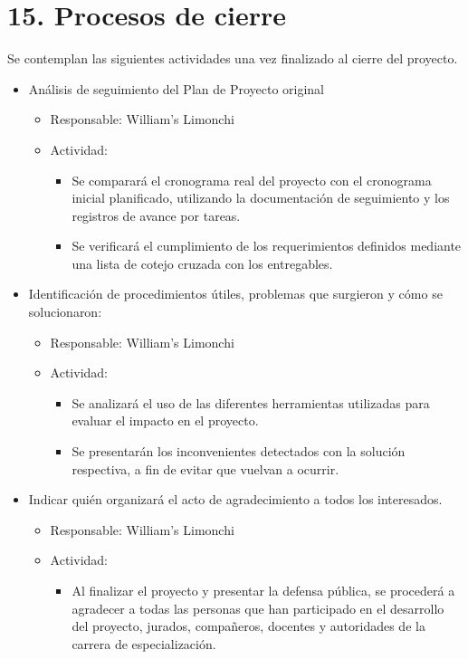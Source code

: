 \documentclass[
11pt, %
]{charter}
\begin{document}
\section{15. Procesos de cierre}    
\label{sec:cierre}

Se contemplan las siguientes actividades una vez finalizado al cierre del proyecto.

\begin{itemize}
	\item Análisis de seguimiento del Plan de Proyecto original
	\begin{itemize}
		\item Responsable: William’s Limonchi
		\item Actividad: 
		\begin{itemize}
			\item Se comparará el cronograma real del proyecto con el cronograma inicial planificado, utilizando la documentación de seguimiento y los registros de avance por tareas.
			\item Se verificará el cumplimiento de los requerimientos definidos mediante una lista de cotejo cruzada con los entregables.
		\end{itemize}
	\end{itemize}
	\item Identificación de procedimientos útiles, problemas que surgieron y cómo se solucionaron:
	\begin{itemize}
		\item Responsable: William’s Limonchi
		\item Actividad: 
		\begin{itemize}
			\item Se analizará el uso de las diferentes herramientas utilizadas para evaluar el
			impacto en el proyecto.
			\item Se presentarán los inconvenientes detectados con la solución respectiva, a fin de
			evitar que vuelvan a ocurrir.
		\end{itemize}
	\end{itemize}
	\item Indicar quién organizará el acto de agradecimiento a todos los interesados.
	\begin{itemize}
		\item Responsable: William’s Limonchi
		\item Actividad: 
		\begin{itemize}
			\item Al finalizar el proyecto y presentar la defensa pública, se procederá a agradecer
			a todas las personas que han participado en el desarrollo del proyecto, jurados,
			compañeros, docentes y autoridades de la carrera de especialización.
		\end{itemize}
	\end{itemize}
\end{itemize}
\end{document}
